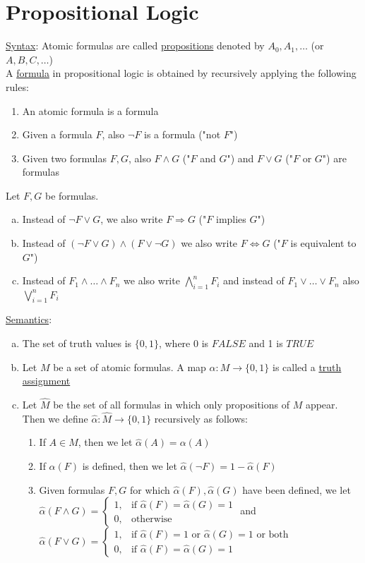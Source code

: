 \documentclass[a4paper]{article}
\newcommand{\ul}{\underline}
\begin{document}
\section{Propositional Logic}
\ul{Syntax}:
Atomic formulas are called \ul{propositions} denoted by $A_0,A_1,\dots$ (or $A,B,C,\dots$)\\
A \ul{formula} in propositional logic is obtained by recursively applying the following rules:
\begin{enumerate}[(1)]
	\item An atomic formula is a formula
	\item Given a formula $F$, also $\neg F$ is a formula ("not $F$")
	\item Given two formulas $F,G$, also $F\wedge G$ ("$F$ and $G$") and $F\vee G$ ("$F$ or $G$") are formulas
\end{enumerate}
Let $F,G$ be formulas.
\begin{enumerate}[(a)]
	\item Instead of $\neg F\vee G$, we also write $F\Rightarrow G$ ("$F$ implies $G$")
	\item Instead of $(\neg F\vee G)\wedge (F\vee \neg G)$ we also write $F\Leftrightarrow G$ ("$F$ is equivalent to $G$")
	\item Instead of $F_1\wedge\dots\wedge F_n$ we also write $\bigwedge_{i=1}^n F_i$ and instead of $F_1\vee\dots\vee F_n$ also $\bigvee_{i=1}^n F_i$
\end{enumerate}
\ul{Semantics}:
\begin{enumerate}[(a)]
	\item The set of truth values is $\{0,1\}$, where 0 is $FALSE$ and 1 is $TRUE$
	\item Let $M$ be a set of atomic formulas. A map $\alpha:M\rightarrow\{0,1\}$ is called a \ul{truth assignment}
	\item Let $\hat{M}$ be the set of all formulas in which only propositions of $M$ appear.\\
	Then we define $\hat{\alpha}:\hat{M}\rightarrow\{0,1\}$ recursively as follows:
	\begin{enumerate}[(1)]
		\item If $A\in M$, then we let $\hat{\alpha}(A)=\alpha(A)$
		\item If $\alpha(F)$ is defined, then we let $\hat{\alpha}(\neg F)=1-\hat{\alpha}(F)$
		\item Given formulas $F,G$ for which $\hat{\alpha}(F),\hat{\alpha}(G)$ have been defined, we let $\hat{\alpha}(F\wedge G)=\begin{cases}
		1, & \text{if } \hat{\alpha}(F)=\hat{\alpha}(G)=1\\
		0, & \text{otherwise}
		\end{cases}$ and $\hat{\alpha}(F\vee G)=\begin{cases}
		1, & \text{if } \hat{\alpha}(F)=1 \text{ or } \hat{\alpha}(G)=1 \text{ or both}\\
		0, & \text{if } \hat{\alpha}(F)=\hat{\alpha}(G)=1
		\end{cases}$
	\end{enumerate}
\end{enumerate}
\end{document}

